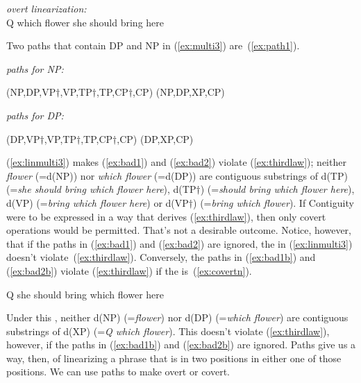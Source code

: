\documentclass[output=paper]{langsci/langscibook}
\begin{document}
\begin{exe}
	\ex \label{ex:linmulti3} \emph{overt  linearization:}\\[3pt] Q which flower she should bring here
\end{exe}

Two paths that contain DP and NP in (\ref{ex:multi3}) are~(\ref{ex:path1}).
\begin{exe}
	\ex \label{ex:path1}
	\begin{xlist}
		\ex \emph{paths for NP:}
		\begin{xlist}
		\ex \label{ex:bad1} (NP,DP,VP$\dag$,VP,TP$\dag$,TP,CP$\dag$,CP)
		\ex \label{ex:bad1b}(NP,DP,XP,CP)
		\end{xlist}
		\ex \emph{paths for DP:}
		\begin{xlist}
			\ex \label{ex:bad2} (DP,VP$\dag$,VP,TP$\dag$,TP,CP$\dag$,CP)
			\ex \label{ex:bad2b}(DP,XP,CP)
		\end{xlist}
	\end{xlist}
\end{exe}

(\ref{ex:linmulti3}) makes (\ref{ex:bad1}) and (\ref{ex:bad2}) violate (\ref{ex:thirdlaw}); neither \emph{flower} (=d(NP)) nor \emph{which flower} (=d(DP)) are contiguous substrings of d(TP) (=\emph{she should bring which flower here}), d(TP$\dag$) (=\emph{should bring which flower here}), d(VP) (=\emph{bring which flower here}) or d(VP$\dag$) (=\emph{bring which flower}). If Contiguity were to be expressed in a way that derives (\ref{ex:thirdlaw}), then only covert  operations would be permitted. That's not a desirable outcome. Notice, however, that if the paths in (\ref{ex:bad1}) and (\ref{ex:bad2}) are ignored, the  in (\ref{ex:linmulti3}) doesn't violate~(\ref{ex:thirdlaw}). Conversely, the paths in (\ref{ex:bad1b}) and (\ref{ex:bad2b}) violate (\ref{ex:thirdlaw}) if the  is~(\ref{ex:covertn}).
\begin{exe}
	\ex \label{ex:covertn} Q she should bring which flower here
\end{exe}

Under this , neither d(NP) (=\emph{flower}) nor d(DP) (=\emph{which flower}) are contiguous substrings of d(XP) (=\emph{Q which flower}). This  doesn't violate (\ref{ex:thirdlaw}), however, if the paths in (\ref{ex:bad1b}) and (\ref{ex:bad2b}) are ignored. Paths give us a way, then, of linearizing a phrase that is in two positions in either one of those positions. We can use paths to make  overt or covert.
\end{document}
